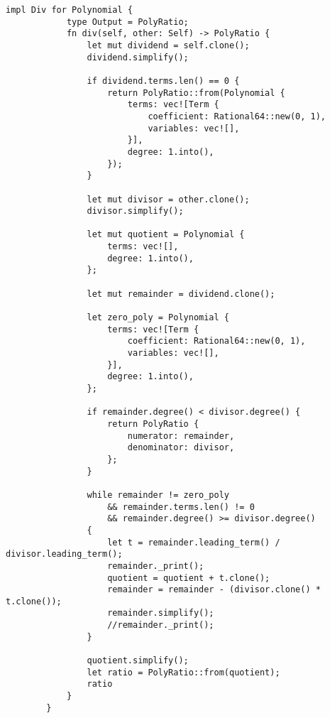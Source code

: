     \begin{lstlisting}[caption={The implementation of the division operation for the \texttt{Polynomial} struct}, label={lst:polynomial-div}]
        impl Div for Polynomial {
            type Output = PolyRatio;
            fn div(self, other: Self) -> PolyRatio {
                let mut dividend = self.clone();
                dividend.simplify();
        
                if dividend.terms.len() == 0 {
                    return PolyRatio::from(Polynomial {
                        terms: vec![Term {
                            coefficient: Rational64::new(0, 1),
                            variables: vec![],
                        }],
                        degree: 1.into(),
                    });
                }
        
                let mut divisor = other.clone();
                divisor.simplify();
        
                let mut quotient = Polynomial {
                    terms: vec![],
                    degree: 1.into(),
                };
        
                let mut remainder = dividend.clone();
        
                let zero_poly = Polynomial {
                    terms: vec![Term {
                        coefficient: Rational64::new(0, 1),
                        variables: vec![],
                    }],
                    degree: 1.into(),
                };
        
                if remainder.degree() < divisor.degree() {
                    return PolyRatio {
                        numerator: remainder,
                        denominator: divisor,
                    };
                }
        
                while remainder != zero_poly
                    && remainder.terms.len() != 0
                    && remainder.degree() >= divisor.degree()
                {
                    let t = remainder.leading_term() / divisor.leading_term();
                    remainder._print();
                    quotient = quotient + t.clone();
                    remainder = remainder - (divisor.clone() * t.clone());
                    remainder.simplify();
                    //remainder._print();
                }
        
                quotient.simplify();
                let ratio = PolyRatio::from(quotient);
                ratio
            }
        }
    \end{lstlisting}        

